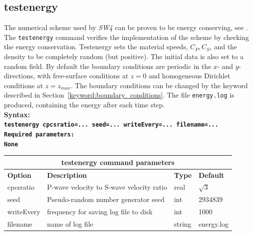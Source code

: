 \documentclass[11pt]{report}
\begin{document}
{\subsection{testenergy}
\begin{flushleft}
	The numerical scheme used by \emph{SW4} can be proven to be energy conserving, see \cite{SjoPet-12}.
	The {\tt testenergy} command verifies the implementation of the scheme by checking the energy
	conservation.  Testenergy sets the material speeds, $C_P,C_S$, and the density to be completely
	random (but positive). The initial data is also set to a random field.  By default the boundary
	conditions are periodic in the $x$- and $y$-directions, with free-surface conditions at $z=0$ and
	homogeneous Dirichlet conditions at $z=z_{max}$. The boundary conditions can be changed by the
	keyword described in Section~\ref{keyword:boundary_conditions}.  The file \verb+energy.log+ is
	produced, containing the energy after each time step.  \\ \bf Syntax:\\ \tt testenergy
	cpcsratio=... seed=... writeEvery=... filename=...  \\ \bf Required parameters:\\ \rm None
\end{flushleft}
\begin{center}
	\begin{tabular}{|l|p{8cm}|l|l|} \hline
		\multicolumn{4}{|c|}{\bf testenergy command parameters}                           \\ \hline
		\bf{Option} & \bf{Description}                         & \bf{Type} & \bf{Default} \\ \hline \hline
		cpcsratio   & P-wave velocity to S-wave velocity ratio & real      & $\sqrt{3}$   \\ \hline
		seed        & Pseudo-random number generator seed      & int       & 2934839      \\ \hline
		writeEvery  & frequency for saving log file to disk    & int       & 1000         \\ \hline
		filename    & name of log file                         & string    & energy.log   \\ \hline
	\end{tabular}
\end{center}


}
\end{document}
